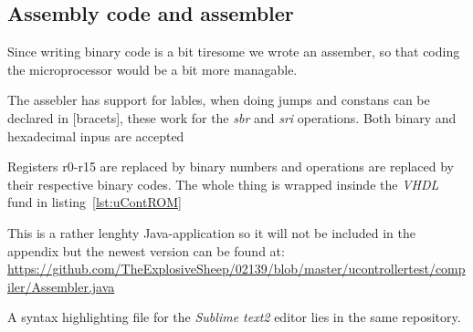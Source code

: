 \subsection{Assembly code and assembler}
Since writing binary code is a bit tiresome we wrote an assember,
so that coding the microprocessor would be a bit more managable.

The assebler has support for lables, when doing jumps
and constans can be declared in [bracets], these work for the \emph{sbr} and
\emph{sri} operations. Both binary and hexadecimal inpus are accepted

Registers r0-r15 are replaced by binary numbers and operations are replaced by
their respective binary codes. The whole thing is wrapped insinde the
\emph{VHDL} fund in listing~\ref{lst:uContROM}

This is a rather lenghty Java-application so it will not be included in the
appendix but the newest version can be found at:
\url{https://github.com/TheExplosiveSheep/02139/blob/master/ucontrollertest/compiler/Assembler.java}

A syntax highlighting file for the \emph{Sublime text2} editor lies in the same
repository.